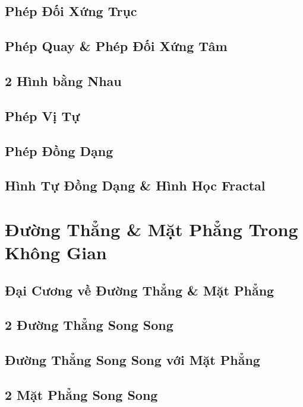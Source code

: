 \documentclass[oneside]{book}
\numberwithin{equation}{section}
\begin{document}
\section{Phép Đối Xứng Trục}

\section{Phép Quay \& Phép Đối Xứng Tâm}

\section{2 Hình bằng Nhau}

\section{Phép Vị Tự}

\section{Phép Đồng Dạng}

\section{Hình Tự Đồng Dạng \& Hình Học Fractal}


\chapter{Đường Thẳng \& Mặt Phẳng Trong Không Gian}

\section{Đại Cương về Đường Thẳng \& Mặt Phẳng}

\section{2 Đường Thẳng Song Song}

\section{Đường Thẳng Song Song với Mặt Phẳng}

\section{2 Mặt Phẳng Song Song}
\end{document}

